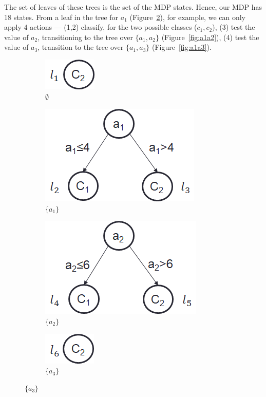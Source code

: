 \documentclass[letterpaper]{article}
\theoremstyle{definition}
\begin{document}
The set of leaves of these trees is the set of the MDP states. Hence, our MDP has 18 states. From a leaf in the tree for $a_1$ (Figure~\ref{fig:a1}), for example, we can only apply 4 actions --- (1,2) classify, for the two possible classes ($c_1,c_2$), (3) test the value of $a_2$, transitioning to the tree over $\{a_1,a_2\}$ (Figure~\ref{fig:a1a2}), (4) test the value of $a_3$, transition to the tree over $\{a_1,a_3\}$ (Figure~\ref{fig:a1a3}).

\begin{figure}[!t]
	\centering
    \hspace{-10mm}
	\begin{subfigure}[t]{0.4\linewidth}\vskip 0pt
		\centering
		\caption{$\emptyset$}\label{fig:EmpyTree}
		\includegraphics[scale=0.4]{empty}
	\end{subfigure}

    \hspace{-10mm}
	\begin{subfigure}[t]{0.4\linewidth}\vskip 0pt
		\centering
		\caption{$\{a_1\}$}\label{fig:a1}
		\includegraphics[scale=0.4]{a1}
	\end{subfigure}
	\quad
	\begin{subfigure}[t]{1in}\vskip 0pt
		\centering
		\caption{$\{a_2\}$}\label{fig:a2}
		\includegraphics[scale=0.4]{a2}
	\end{subfigure}
	\quad
	\begin{subfigure}[t]{1in}\vskip 0pt
		\centering
		\caption{$\{a_3\}$}\label{fig:a3}
		\includegraphics[scale=0.4]{a3}
	\end{subfigure}


\end{figure}
\end{document}
